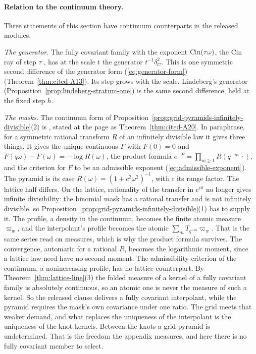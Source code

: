 \paragraph{Relation to the continuum theory.} Three statements of this section have continuum
counterparts in the released modules.

\emph{The generator.} The fully covariant family with the exponent $\operatorname{Cin}(\tau\omega)$, the Cin ray
of step $\tau$ , has at the scale $t$ the generator
$t^{-1}\delta^2_{t\tau}$. This is one symmetric second difference of the generator form
(\ref{eq:generator-form}) 
(Theorem~\ref{thm:cited-A13}). Its step grows with the scale. Lindeberg's generator
(Proposition~\ref{prop:lindeberg-stratum-one}) is the same second difference, held at the fixed
step $h$.

\emph{The masks.} The continuum form of
Proposition~\ref{prop:grid-pyramids-infinitely-divisible}(2) is
, stated at the page as Theorem~\ref{thm:cited-A20}. In
paraphrase, for a symmetric rational transform $R$ of an infinitely divisible law it gives three
things. It gives the unique continuous $F$ with $F(0) = 0$ and
$F(q\omega) - F(\omega) = -\log R(\omega)$, the product formula
$e^{-F} = \prod_{m \ge 1}R(q^{-m}\,\cdot)$, and the criterion for $F$ to be an admissible
exponent (\ref{eq:admissible-exponent}). The \Matern{} pyramid is its case
$R(\omega) = (1 + c^2\omega^2)^{-1}$, with $c$ its range factor. The lattice half differs. On
the lattice, rationality of the transfer in $e^{i\vartheta}$ no longer gives infinite
divisibility: the binomial mask has a rational transfer and is not infinitely divisible, so
Proposition~\ref{prop:grid-pyramids-infinitely-divisible}(1) has to supply it. The profile, a
density in the continuum, becomes the finite atomic measure $\varpi_w$, and the interpolant's
profile becomes the atomic $\sum_mT_{q^{-m}}\varpi_w$. That is the same series read on measures,
which is why the product formula survives. The convergence, automatic for a rational $R$, becomes
the logarithmic moment, since a lattice law need have no second moment. The admissibility
criterion of the continuum, a nonincreasing profile, has no lattice counterpart. By
Theorem~\ref{thm:lattice-line}(3) the folded \Levy{} measure of a kernel of a fully covariant
family is absolutely continuous, so an atomic one is never the \Levy{} measure of such a kernel.
So the released clause delivers a fully covariant interpolant, while the pyramid requires the
mask's own covariance under one ratio. The grid meets that weaker demand, and what replaces the
uniqueness of the interpolant is the uniqueness of the knot kernels. Between the knots a grid
pyramid is undetermined. That is the freedom the appendix measures, and here there is no fully
covariant member to select.

